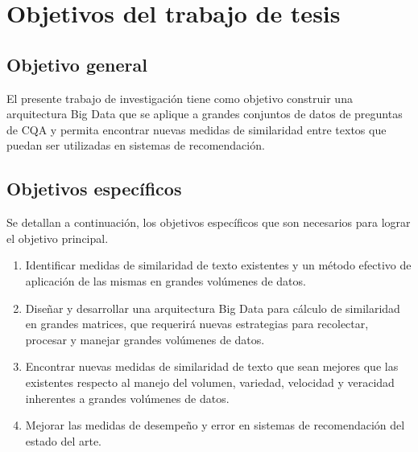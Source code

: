 \newpage \section{Objetivos del trabajo de tesis}\label{ch:objetivos}
\subsection{Objetivo general}
\noindent El presente trabajo de investigación tiene como objetivo construir una arquitectura Big Data que se aplique a grandes conjuntos de datos de preguntas de CQA y permita encontrar nuevas medidas de similaridad entre textos que puedan ser utilizadas en sistemas de recomendación.
\subsection{Objetivos específicos}
\noindent Se detallan a continuación, los objetivos específicos que son necesarios para lograr el objetivo principal.
\begin{enumerate}
	\item Identificar medidas de similaridad de texto existentes y un método efectivo de aplicación de las mismas en grandes volúmenes de datos.
	\item Diseñar y desarrollar una arquitectura Big Data para cálculo de similaridad en grandes matrices, que requerirá nuevas estrategias para recolectar, procesar y manejar grandes volúmenes de datos.
	\item Encontrar nuevas medidas de similaridad de texto que sean mejores que las existentes respecto al manejo del volumen, variedad, velocidad y veracidad inherentes a grandes volúmenes de datos.
	\item Mejorar las medidas de desempeño y error en sistemas de recomendación del estado del arte.
\end{enumerate}